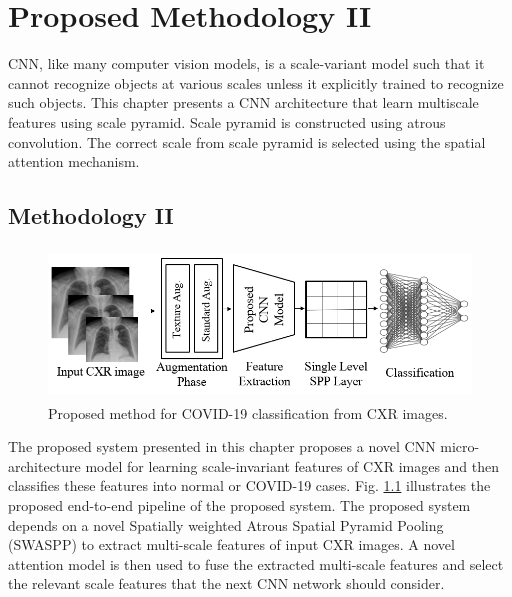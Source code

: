 
\chapter{Proposed Methodology II} %

\label{chp:proposed2} %


CNN, like many computer vision models, is a scale-variant \cite{van2017learning} model such that it cannot recognize objects at various scales unless it explicitly trained to recognize such objects. This chapter presents a CNN architecture that learn multiscale features using scale pyramid. Scale pyramid is constructed using atrous convolution. The correct scale from scale pyramid is selected using the spatial attention mechanism.
\section{Methodology II} 

\begin{center}
    \begin{figure}[htbp]
    \centerline{\includegraphics[height=40mm,width=15cm]{Figures/ProposedPipe.png}}
    \caption{Proposed method for COVID-19 classification from CXR images.}\label{ProposedPipe}\end{figure}\end{center}
    
The proposed system presented in this chapter proposes a novel CNN micro-architecture model for learning  scale-invariant features of   CXR images and then classifies these features into normal or COVID-19 cases. Fig. \ref{ProposedPipe} illustrates the proposed end-to-end pipeline  of the proposed system. The proposed system depends on a novel Spatially weighted Atrous Spatial Pyramid Pooling (SWASPP) to extract multi-scale features of input CXR images. A novel attention model is then used to fuse the extracted multi-scale  features and select the relevant scale features that the next CNN network should consider.
